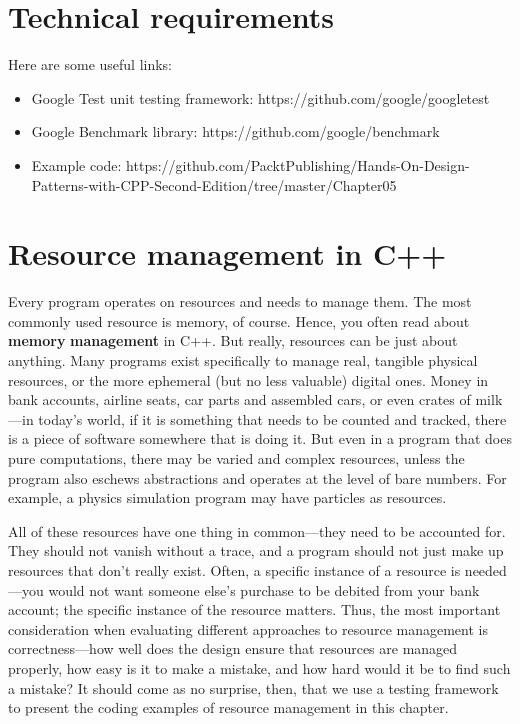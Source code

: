 \section{Technical requirements}

Here are some useful links:

\begin{itemize}
\item
  Google Test unit testing framework: https://github.com/google/googletest
\item
  Google Benchmark library: https://github.com/google/benchmark
\item
  Example code: https://github.com/PacktPublishing/Hands-On-Design-Patterns-with-CPP-Second-Edition/tree/master/Chapter05{}{}
\end{itemize}

\section{Resource management in C++}

Every program operates on resources and needs to manage them. The most commonly used resource is memory, of course. Hence, you often read about \textbf{memory} \textbf{management} in C++. But really, resources can be just about anything. Many programs exist specifically to manage real, tangible physical resources, or the more ephemeral (but no less valuable) digital ones. Money in bank accounts, airline seats, car parts and assembled cars, or even crates of milk---in today's world, if it is something that needs to be counted and tracked, there is a piece of software somewhere that is doing it. But even in a program that does pure computations, there may be varied and complex resources, unless the program also eschews abstractions and operates at the level of bare numbers. For example, a physics simulation program may have particles as resources.

All of these resources have one thing in common---they need to be accounted for. They should not vanish without a trace, and a program should not just make up resources that don't really exist. Often, a specific instance of a resource is needed---you would not want someone else's purchase to be debited from your bank account; the specific instance of the resource matters. Thus, the most important consideration when evaluating different approaches to resource management is correctness---how well does the design ensure that resources are managed properly, how easy is it to make a mistake, and how hard would it be to find such a mistake? It should come as no surprise, then, that we use a testing framework to present the coding examples of resource management in this chapter.

